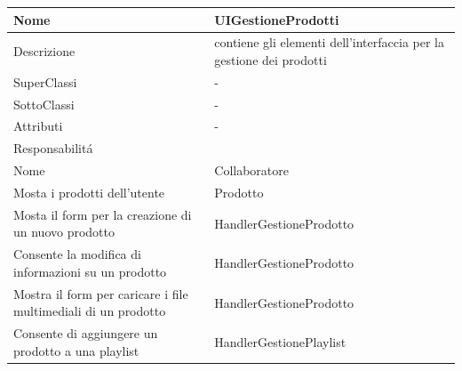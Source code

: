 \begin{center} %
    \begin{longtable}{ |p{3cm}|p{3cm}|p{3cm}|p{3cm}| }
        \hline
        Nome & \multicolumn{3}{|p{9cm}|}{UIGestioneProdotti} \\\hline
        Descrizione & \multicolumn{3}{|p{9cm}|}{contiene gli elementi dell'interfaccia per la gestione dei prodotti} \\\hline
        SuperClassi & \multicolumn{3}{|p{9cm}|}{-} \\\hline
        SottoClassi & \multicolumn{3}{|p{9cm}|}{-} \\\hline
        Attributi & \multicolumn{3}{|p{9cm}|}{-} \\\hline
        \multicolumn{4}{|p{12cm}|}{Responsabilit\'a} \\\hline %
        \multicolumn{2}{|p{6cm}|}{Nome} & \multicolumn{2}{|p{6cm}|}{Collaboratore} \\\hline
        \multicolumn{2}{|p{6cm}|}{Mosta i prodotti dell'utente} & \multicolumn{2}{|p{6cm}|}{Prodotto} \\\hline
        \multicolumn{2}{|p{6cm}|}{Mosta il form per la creazione di un nuovo prodotto} & \multicolumn{2}{|p{6cm}|}{HandlerGestioneProdotto} \\\hline
        \multicolumn{2}{|p{6cm}|}{Consente la modifica di informazioni su un prodotto} & \multicolumn{2}{|p{6cm}|}{HandlerGestioneProdotto} \\\hline
        \multicolumn{2}{|p{6cm}|}{Mostra il form per caricare i file multimediali di un prodotto} & \multicolumn{2}{|p{6cm}|}{HandlerGestioneProdotto} \\\hline
        \multicolumn{2}{|p{6cm}|}{Consente di aggiungere un prodotto a una playlist} & \multicolumn{2}{|p{6cm}|}{HandlerGestionePlaylist} \\\hline
    \end{longtable}
\end{center}




